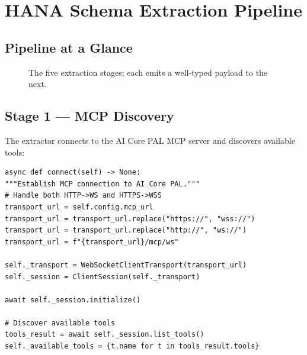 \documentclass[12pt,a4paper,twoside]{report}
\begin{document}
\chapter{HANA Schema Extraction Pipeline}
\label{chap:extraction}

\section{Pipeline at a Glance}

\begin{figure}[H]
\centering
{}
\caption{The five extraction stages; each emits a well-typed payload to the next.}
\label{fig:extraction-pipeline}
\end{figure}

\section{Stage 1 --- MCP Discovery}

The extractor connects to the AI Core PAL MCP server and discovers available tools:

\begin{lstlisting}[language=jsonx,caption={MCP connection (hana\_schema\_extractor.py, lines 45--60)}]
async def connect(self) -> None:
"""Establish MCP connection to AI Core PAL."""
# Handle both HTTP->WS and HTTPS->WSS
transport_url = self.config.mcp_url
transport_url = transport_url.replace("https://", "wss://")
transport_url = transport_url.replace("http://", "ws://")
transport_url = f"{transport_url}/mcp/ws"

self._transport = WebSocketClientTransport(transport_url)
self._session = ClientSession(self._transport)

await self._session.initialize()

# Discover available tools
tools_result = await self._session.list_tools()
self._available_tools = {t.name for t in tools_result.tools}
\end{lstlisting}
\end{document}
